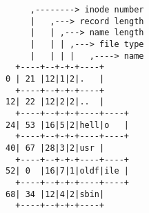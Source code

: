 \documentclass[varwidth,crop]{standalone}
\begin{document}
\begin{verbatim}
     ,--------> inode number
     |   ,---> record length
     |   | ,---> name length
     |   | | ,---> file type
     |   | | |   ,----> name
  +----+--+-+-+----+
0 | 21 |12|1|2|.   |
  +----+--+-+-+----+
12| 22 |12|2|2|..  |
  +----+--+-+-+----+----+
24| 53 |16|5|2|hell|o   |
  +----+--+-+-+----+----+
40| 67 |28|3|2|usr |
  +----+--+-+-+----+----+
52| 0  |16|7|1|oldf|ile |
  +----+--+-+-+----+----+
68| 34 |12|4|2|sbin|
  +----+--+-+-+----+
\end{verbatim}
\end{document}
